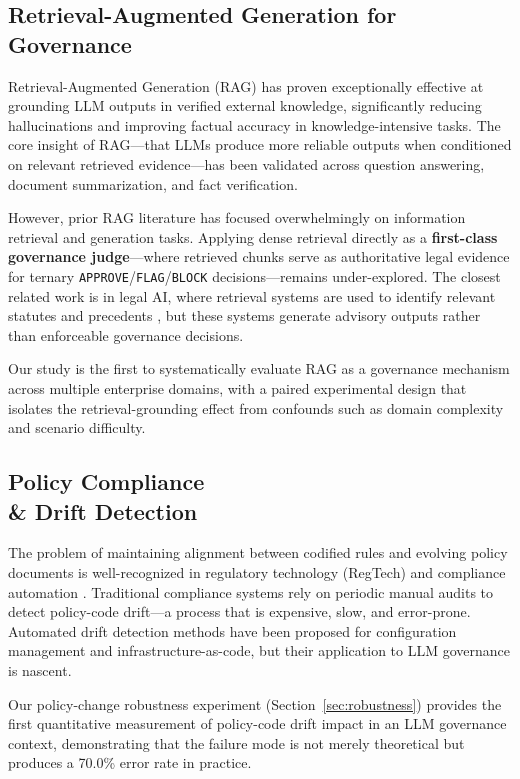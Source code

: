 \documentclass[sigconf,screen]{acmart}
\begin{document}
\subsection{Retrieval-Augmented Generation for Governance}
Retrieval-Augmented Generation (RAG) \cite{lewis2020retrieval} has proven exceptionally effective at grounding LLM outputs in verified external knowledge, significantly reducing hallucinations \cite{huang2023survey} and improving factual accuracy in knowledge-intensive tasks. The core insight of RAG---that LLMs produce more reliable outputs when conditioned on relevant retrieved evidence---has been validated across question answering, document summarization, and fact verification.

However, prior RAG literature has focused overwhelmingly on information retrieval and generation tasks. Applying dense retrieval directly as a \textbf{first-class governance judge}---where retrieved chunks serve as authoritative legal evidence for ternary \texttt{APPROVE}/\texttt{FLAG}/\texttt{BLOCK} decisions---remains under-explored. The closest related work is in legal AI, where retrieval systems are used to identify relevant statutes and precedents \cite{zhong2020does}, but these systems generate advisory outputs rather than enforceable governance decisions.

Our study is the first to systematically evaluate RAG as a governance mechanism across multiple enterprise domains, with a paired experimental design that isolates the retrieval-grounding effect from confounds such as domain complexity and scenario difficulty.

\subsection{Policy Compliance \\\& Drift Detection}
The problem of maintaining alignment between codified rules and evolving policy documents is well-recognized in regulatory technology (RegTech) and compliance automation \cite{arner2017fintech}. Traditional compliance systems rely on periodic manual audits to detect policy-code drift---a process that is expensive, slow, and error-prone. Automated drift detection methods have been proposed for configuration management and infrastructure-as-code, but their application to LLM governance is nascent.

Our policy-change robustness experiment (Section~\ref{sec:robustness}) provides the first quantitative measurement of policy-code drift impact in an LLM governance context, demonstrating that the failure mode is not merely theoretical but produces a 70.0\% error rate in practice.
\end{document}
